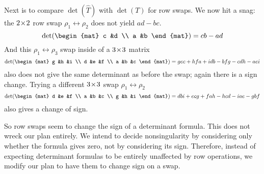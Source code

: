 Next is to compare \( \det(\hat{T}) \) with 
\( \det(T) \) for row swaps.
We now hit a snag:
the \(2 \! \times \! 2\) row swap $\rho_1\leftrightarrow\rho_2$
does not yield \( ad-bc \).
  \begin{equation*}
     \det(
       \begin{mat}
         c  &d \\
         a  &b
       \end{mat}
     )
     = cb - ad
  \end{equation*}
And this $\rho_1\leftrightarrow\rho_3$ swap inside of a \(3 \! \times \! 3\) matrix
\begin{equation*}
   \det(
     \begin{mat}
        g  &h  &i \\
        d  &e  &f \\
        a  &b  &c
     \end{mat}
   )
   = gec + hfa + idb - bfg - cdh - aei
\end{equation*}
also does not give the same determinant as before the swap; again 
there is a sign change.
Trying a different \(3 \! \times \! 3\) swap $\rho_1\leftrightarrow\rho_2$ 
\begin{equation*}
   \det(
     \begin{mat}
        d  &e  &f \\
        a  &b  &c \\
        g  &h  &i
     \end{mat}
   )
   = dbi + ecg + fah - hcd - iae - gbf
\end{equation*}
also gives a change of sign.

So row swaps seem 
to change the sign of a determinant formula.
This does not wreck our plan entirely.
We intend to decide nonsingularity by considering
only whether the formula gives zero, not by considering its sign.
Therefore, instead of expecting determinant formulas to be
entirely unaffected by row operations, we modify our plan to 
have them to change sign on a swap.

